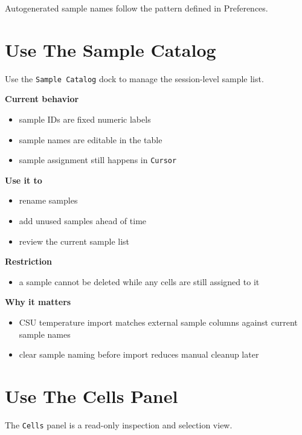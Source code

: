 \documentclass[
  9pt,
  letterpaper,
  oneside,
  open=any,
  DIV=15,
  parskip=half-,
  headings=big,
  numbers=noenddot
]{scrbook}
\newcommand{\manuallead}[1]{%
  \vspace{0.15em}%
  {\sffamily\bfseries\color{ManualBlue}#1}\par\nobreak\vspace{0.05em}%
}
\begin{document}
Autogenerated sample names follow the pattern defined in Preferences.


\section{Use The Sample Catalog}

Use the \texttt{Sample Catalog} dock to manage the session-level sample list.


\manuallead{Current behavior}

\begin{itemize}[leftmargin=*,itemsep=0.35em,topsep=0.4em]
\item sample IDs are fixed numeric labels
\item sample names are editable in the table
\item sample assignment still happens in \texttt{Cursor}
\end{itemize}

\manuallead{Use it to}

\begin{itemize}[leftmargin=*,itemsep=0.35em,topsep=0.4em]
\item rename samples
\item add unused samples ahead of time
\item review the current sample list
\end{itemize}

\manuallead{Restriction}

\begin{itemize}[leftmargin=*,itemsep=0.35em,topsep=0.4em]
\item a sample cannot be deleted while any cells are still assigned to it
\end{itemize}

\manuallead{Why it matters}

\begin{itemize}[leftmargin=*,itemsep=0.35em,topsep=0.4em]
\item CSU temperature import matches external sample columns against current sample names
\item clear sample naming before import reduces manual cleanup later
\end{itemize}

\section{Use The Cells Panel}

The \texttt{Cells} panel is a read-only inspection and selection view.
\end{document}
